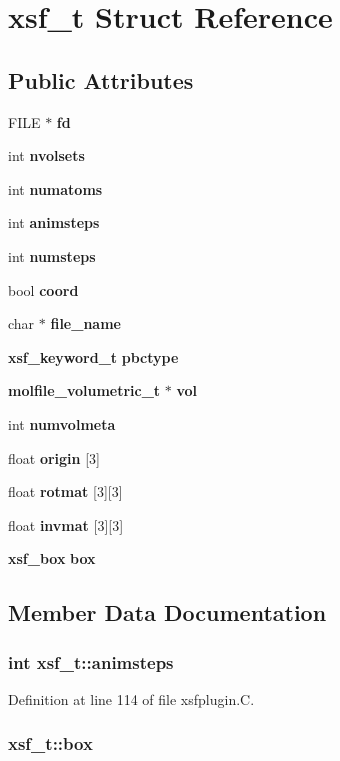 \section{xsf\_\-t  Struct Reference}
\label{structxsf__t}
\subsection*{Public Attributes}
\begin{CompactItemize}
\item 
FILE $\ast$ {\bf fd}
\item 
int {\bf nvolsets}
\item 
int {\bf numatoms}
\item 
int {\bf animsteps}
\item 
int {\bf numsteps}
\item 
bool {\bf coord}
\item 
char $\ast$ {\bf file\_\-name}
\item 
{\bf xsf\_\-keyword\_\-t} {\bf pbctype}
\item 
{\bf molfile\_\-volumetric\_\-t} $\ast$ {\bf vol}
\item 
int {\bf numvolmeta}
\item 
float {\bf origin} [3]
\item 
float {\bf rotmat} [3][3]
\item 
float {\bf invmat} [3][3]
\item 
{\bf xsf\_\-box} {\bf box}
\end{CompactItemize}


\subsection{Member Data Documentation}
\subsubsection{\setlength{\rightskip}{0pt plus 5cm}int xsf\_\-t::animsteps}\label{structxsf__t_m3}




Definition at line 114 of file xsfplugin.C.
\subsubsection{ xsf\_\-t::box}\label{structxsf__t_m13}




